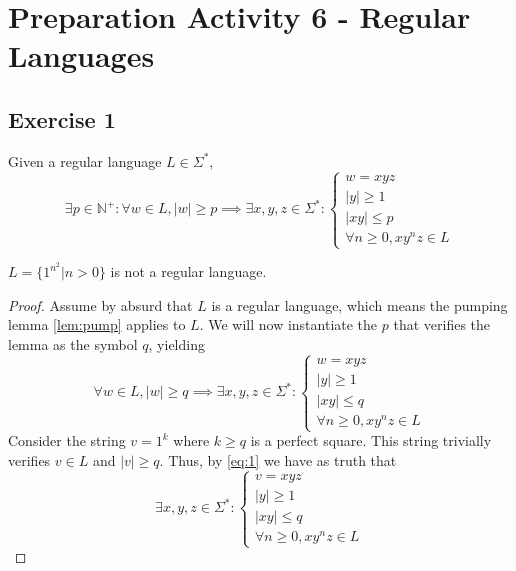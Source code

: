 \setcounter{section}{5}
\section{Preparation Activity 6 - Regular Languages}
{
\renewcommand{\thesubsubsection}{\thesubsection\alph{subsubsection}}
\subsection{Exercise 1}
\begin{lemma} \label{lem:pump}
Given a regular language $L \in \Sigma^*$,
\begin{equation*}
	\exists p \in \mathbb{N}^+ \colon \forall w \in L, |w|\geq p \implies
	\exists x,y,z \in \Sigma^* \colon
	\begin{cases}
		w=xyz\\
		|y|\geq 1\\
		|xy|\leq p\\
		\forall n \geq 0, x y^n z \in L
	\end{cases}
\end{equation*}
\end{lemma}
\begin{theorem}
	$L=\{1^{n^2} | n>0\}$ is not a regular language.
\end{theorem}
\begin{proof}
Assume by absurd that $L$ is a regular language, which means the pumping lemma \eqref{lem:pump} applies to $L$. We will now instantiate the $p$ that verifies the lemma as the symbol $q$, yielding
	\begin{equation} \label{eq:1}
	\forall w \in L, |w|\geq q \implies
	\exists x,y,z \in \Sigma^* \colon
	\begin{cases}
		w=xyz\\
		|y|\geq 1\\
		|xy|\leq q\\
		\forall n \geq 0, x y^n z \in L
	\end{cases}
\end{equation}
Consider the string $v=1^k$ where $k\geq q$ is a perfect square. This string trivially verifies $v \in L$ and $|v|\geq q$. Thus, by \eqref{eq:1} we have as truth that
\begin{equation}\label{eq:3}
	\exists x,y,z \in \Sigma^* \colon
	\begin{cases}
		v=xyz\\
		|y|\geq 1\\
		|xy|\leq q\\
		\forall n \geq 0, x y^n z \in L

\end{cases}
\end{equation}
\end{proof}}
